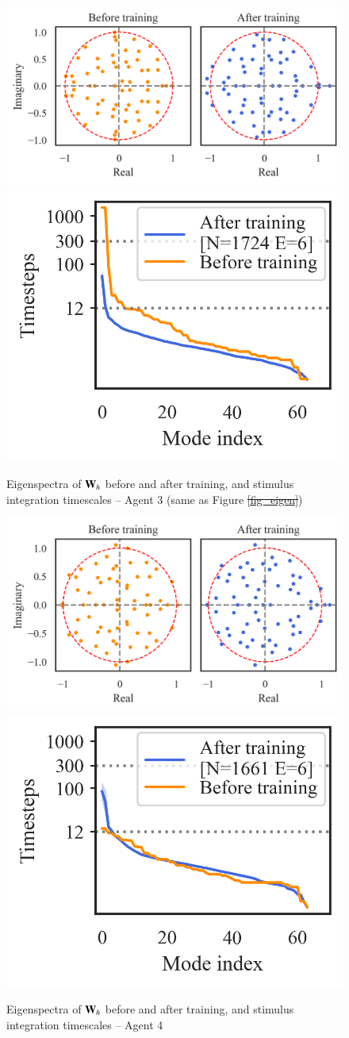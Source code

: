 \documentclass[5p,twocolumn,authoryear]{elsarticle}
\providecommand{\DIFaddtex}[1]{{\protect\color{blue}\uwave{#1}}} %
\providecommand{\DIFdeltex}[1]{{\protect\color{red}\sout{#1}}}                      %
\providecommand{\DIFaddFL}[1]{\DIFadd{#1}} %
\providecommand{\DIFdelFL}[1]{\DIFdel{#1}} %
\providecommand{\DIFaddbeginFL}{} %
\providecommand{\DIFaddendFL}{} %
\providecommand{\DIFdelbeginFL}{} %
\providecommand{\DIFdelendFL}{} %
\providecommand{\DIFadd}[1]{\texorpdfstring{\DIFaddtex{#1}}{#1}} %
\providecommand{\DIFdel}[1]{\texorpdfstring{\DIFdeltex{#1}}{}} %
\newcommand{\DIFscaledelfig}{0.5}
\newlength{\DIFdelgraphicswidth} %
\newlength{\DIFdelgraphicsheight} %
\newcommand{\DIFaddincludegraphics}[2][]{{\color{blue}\fbox{\DIFOincludegraphics[#1]{#2}}}} %
\newcommand{\DIFdelincludegraphics}[2][]{%
\sbox{\DIFdelgraphicsbox}{\DIFOincludegraphics[#1]{#2}}%
\settoboxwidth{\DIFdelgraphicswidth}{\DIFdelgraphicsbox} %
\settoboxtotalheight{\DIFdelgraphicsheight}{\DIFdelgraphicsbox} %
\scalebox{\DIFscaledelfig}{%
\parbox[b]{\DIFdelgraphicswidth}{\usebox{\DIFdelgraphicsbox}\\[-\baselineskip] \rule{\DIFdelgraphicswidth}{0em}}\llap{\resizebox{\DIFdelgraphicswidth}{\DIFdelgraphicsheight}{%
\setlength{\unitlength}{\DIFdelgraphicswidth}%
\begin{picture}(1,1)%
\thicklines\linethickness{2pt} %
{\color[rgb]{1,0,0}\put(0,0){\framebox(1,1){}}}%
{\color[rgb]{1,0,0}\put(0,0){\line( 1,1){1}}}%
{\color[rgb]{1,0,0}\put(0,1){\line(1,-1){1}}}%
\end{picture}%
}\hspace*{3pt}}} %
} %
\DeclareRobustCommand{\DIFaddbeginFL}{\DIFOaddbeginFL \let\includegraphics\DIFaddincludegraphics} %
\DeclareRobustCommand{\DIFaddendFL}{\DIFOaddendFL \let\includegraphics\DIFOincludegraphics} %
\DeclareRobustCommand{\DIFdelbeginFL}{\DIFOdelbeginFL \let\includegraphics\DIFdelincludegraphics} %
\DeclareRobustCommand{\DIFdelendFL}{\DIFOaddendFL \let\includegraphics\DIFOincludegraphics} %
\begin{document}
\begin{figure}[h!]
\centering
\includegraphics[width=0.45\linewidth]{eigenspectra_3307e9.png}
\includegraphics[width=0.27\linewidth]{timescales_3307e9.png}
\caption[Eigenspectra of $\bW_h$ before and after training, and stimulus integration timescales -- Agent 3]{Eigenspectra of $\bW_h$ before and after training, and stimulus integration timescales -- Agent 3 (same as Figure \DIFdelbeginFL \DIFdelFL{\ref{fig_eigen}}\DIFdelendFL \DIFaddbeginFL \DIFaddFL{\ref{fig_eigen_mlps}}\DIFaddendFL )}
\end{figure}

\begin{figure}[h!]
\centering
\includegraphics[width=0.45\linewidth]{eigenspectra_541058.png}
\includegraphics[width=0.27\linewidth]{timescales_541058.png}
\caption{Eigenspectra of $\bW_h$ before and after training, and stimulus integration timescales -- Agent 4}
\end{figure}
\end{document}
